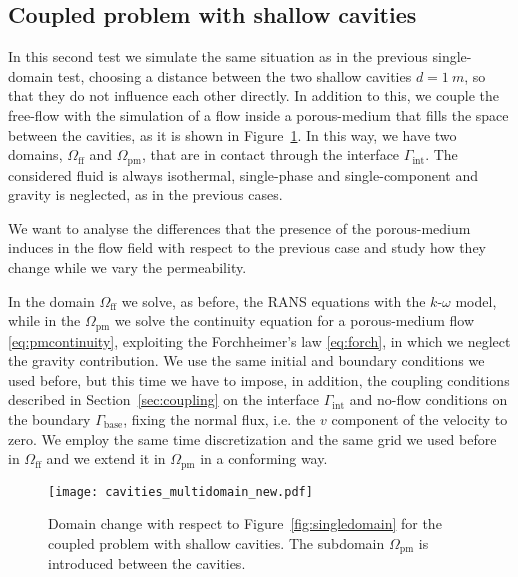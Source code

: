 \subsection{Coupled problem with shallow cavities}
In this second test we simulate the same situation as in the previous 
single-domain test, 
choosing a distance between the two shallow cavities $d=\SI{1}{m}$, so that they do not influence each other directly. In addition to this, we couple the free-flow with the simulation of a flow inside a porous-medium that fills the space between 
the cavities, as it is shown in Figure~\ref{fig:multidomain}. In this way, we 
have two domains, $\Omega_\text{ff}$ and $\Omega_\text{pm}$, that are in contact through the 
interface $\Gamma_\text{int}$. The considered fluid is always isothermal, single-phase and single-component and gravity is neglected, as in the previous cases.

We want to analyse the differences that the presence of the porous-medium 
induces in the flow field with respect to the previous case and study how they 
change while we vary the permeability.

In the domain $\Omega_\text{ff}$ we solve, as before, the RANS equations with the 
$k\text{-}\omega$ model, while in the $\Omega_\text{pm}$ we solve the continuity equation
for a porous-medium flow \eqref{eq:pmcontinuity}, exploiting the Forchheimer's law \eqref{eq:forch}, in which we neglect the gravity contribution.
We use the same initial and boundary conditions we used before, but this time 
we have to impose, in addition, the coupling conditions described in 
Section~\ref{sec:coupling} on the interface 
$\Gamma_\text{int}$ and no-flow conditions on the boundary $\Gamma_\text{base}$, fixing the normal flux, i.e. the $v$ component of the velocity to zero.
We employ the same time discretization and the same grid we used before in $\Omega_\text{ff}$ and we extend it in 
$\Omega_\text{pm}$ in a conforming way.
\begin{figure}
	\centering
	\texttt{[image: cavities\_multidomain\_new.pdf]}
	\caption[Domain change with respect to Figure~\ref{fig:singledomain} for the coupled problem with shallow cavities]{Domain change with respect to Figure~\ref{fig:singledomain} for the coupled problem with shallow cavities. The subdomain $\Omega_\text{pm}$ is introduced between the cavities.}
	\label{fig:multidomain}
\end{figure}

